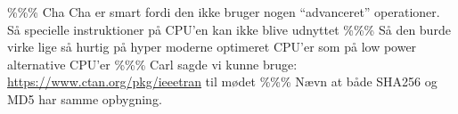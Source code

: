 \documentclass[a4paper]{article}
\begin{document}



\begin{appendix}

\end{appendix}
\%\%\% Cha Cha er smart fordi den ikke bruger nogen ``advanceret'' operationer. Så specielle instruktioner på CPU'en kan ikke blive udnyttet
\%\%\% Så den burde virke lige så hurtig på hyper moderne optimeret CPU'er som på low power alternative CPU'er
\%\%\% Carl sagde vi kunne bruge: \url{https://www.ctan.org/pkg/ieeetran} til mødet
\%\%\% Nævn at både SHA256 og MD5 har samme opbygning.
\end{document}
